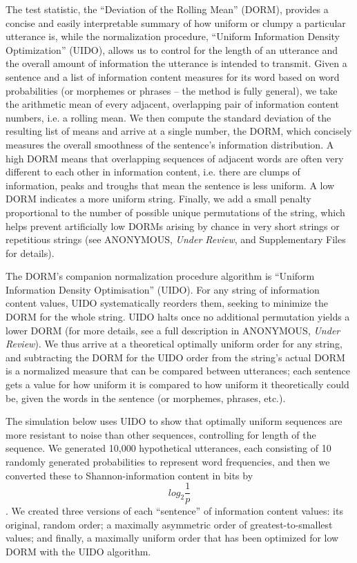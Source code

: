 \documentclass[12pt]{article}
\begin{document}
The test statistic, the ``Deviation of the Rolling Mean'' (DORM), provides a concise and easily interpretable summary of how uniform or clumpy a particular utterance is, while the normalization procedure, ``Uniform Information Density Optimization'' (UIDO), allows us to control for the length of an utterance and the overall amount of information the utterance is intended to transmit. Given a sentence and a list of information content measures for its word based on word probabilities (or morphemes or phrases -- the method is fully general), we take the arithmetic mean of every adjacent, overlapping pair of information content numbers, i.e. a rolling mean. We then compute the standard deviation of the resulting list of means and arrive at a single number, the DORM, which concisely measures the overall smoothness of the sentence's information distribution. A high DORM means that overlapping sequences of adjacent words are often very different to each other in information content, i.e. there are clumps of information, peaks and troughs that mean the sentence is less uniform. A low DORM indicates a more uniform string. Finally, we add a small penalty proportional to the number of possible unique permutations of the string, which helps prevent artificially low DORMs arising by chance in very short strings or repetitious strings (see ANONYMOUS, \textsl{Under Review}, and Supplementary Files for details).

The DORM's companion normalization procedure algorithm is ``Uniform Information Density Optimisation'' (UIDO). For any string of information content values, UIDO systematically reorders them, seeking to minimize the DORM for the whole string. UIDO halts once no additional permutation yields a lower DORM (for more details, see a full description in ANONYMOUS, \textsl{Under Review}). We thus arrive at a theoretical optimally uniform order for any string, and subtracting the DORM for the UIDO order from the string's actual DORM is a normalized measure that can be compared between utterances; each sentence gets a value for how uniform it is compared to how uniform it theoretically could be, given the words in the sentence (or morphemes, phrases, etc.).

The simulation below uses UIDO to show that optimally uniform sequences are more resistant to noise than other sequences, controlling for length of the sequence. We generated 10,000 hypothetical utterances, each consisting of 10 randomly generated probabilities to represent word frequencies, and then we converted these to Shannon-information content in bits by $$log_2 \frac{1}{p}$$. We created three versions of each ``sentence'' of information content values: its original, random order; a maximally asymmetric order of greatest-to-smallest values; and finally, a maximally uniform order that has been optimized for low DORM with the UIDO algorithm.
\end{document}
